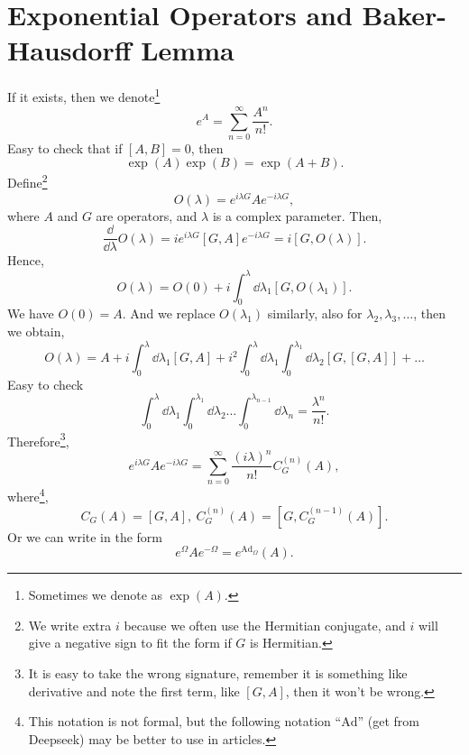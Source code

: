 \documentclass{article}
\theoremstyle{1}
\begin{document}
\section{Exponential Operators and Baker-Hausdorff Lemma }
If it exists, then we denote\footnote{Sometimes we denote as $\exp(A)$.}
\begin{equation}
    e^A=\sum_{n=0}^{\infty}\frac{A^n}{n!}.
\end{equation}
Easy to check that if $[A,B]=0$, then 
\begin{equation}
    \exp(A)\exp(B)=\exp(A+B).
\end{equation}
Define\footnote{We write extra $i$ because we often use the Hermitian conjugate, and $i$ will give a negative sign to fit the form if $G$ is Hermitian.}
\begin{equation}
    O(\lambda)=e^{i\lambda G}Ae^{-i\lambda G},
\end{equation}
where $A$ and $G$ are operators, and $\lambda$ is a complex parameter. Then,
\begin{equation}
    \frac{\dd}{\dd{\lambda}}O(\lambda)=ie^{i\lambda G}[G,A]e^{-i\lambda G}=i[G,O(\lambda)].
\end{equation}
Hence, 
\begin{equation}
    O(\lambda)=O(0)+i\int_{0}^{\lambda}\dd{\lambda_1}[G,O(\lambda_1)].
\end{equation}
We have $O(0)=A$. And we replace $O(\lambda_1)$ similarly, also for $\lambda_2,\lambda_3,\dots$, then we obtain,
\begin{equation}
    O(\lambda)=A+i\int_{0}^{\lambda}\dd{\lambda_1}[G,A]+i^2\int_{0}^{\lambda}\dd{\lambda_1}\int_{0}^{\lambda_1}\dd{\lambda_2}[G,[G,A]]+\dots
\end{equation}
Easy to check 
\begin{equation}
    \int_{0}^{\lambda}\dd{\lambda_1}\int_{0}^{\lambda_1}\dd{\lambda_2}\dots\int_{0}^{\lambda_{n-1}}\dd{\lambda_n}=\frac{\lambda^n}{n!}.
\end{equation}
Therefore\footnote{ It is easy to take the wrong signature, remember it is something like derivative and note the first term, like $[G,A]$, then it won't be wrong.},
\begin{equation}
    \boxed{e^{i\lambda G}Ae^{-i\lambda G}=\sum_{n=0}^{\infty}\frac{\left(i\lambda\right)^n}{n!}C_G^{(n)}(A)},
\end{equation}
where\footnote{This notation is not formal, but the following notation ``$\mathrm{Ad}$'' (get from Deepseek)  may be better to use in articles.}, 
\begin{equation}
    C_G(A)=[G,A],\ C_G^{(n)}(A)=[G,C_G^{(n-1)}(A)].
\end{equation}
Or we can write in the form\label{Baker-Hausdorff lemma} 
\begin{equation}
    e^\Omega A e^{-\Omega }=e^{\mathrm{Ad}_\Omega}(A).
\end{equation}
\end{document}
